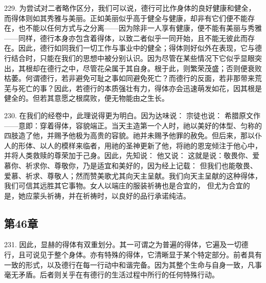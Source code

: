 229. 为尝试对二者略作区分，我们可以说，德行可比作身体的良好健康和健全，而得体则如其秀雅与美丽。正如美丽似乎高于健全与健康，却非有它们便不能存在，也不能以任何方式与之分离——因为除非一人享有健康，便不能有美丽与秀雅——同样，德行本身亦包含着得体，以致二者似乎一同开始，且不能无彼此而存在。因此，德行如同我们一切工作与事业中的健全；得体则好似外在表现，它与德行结合时，只能在我们的思想中被分别认识。因为尽管在某些情况下它似乎显眼突出，其根却在德行之中，尽管花朵属于其自身。根于此，则繁荣茂盛；否则便衰败枯萎。何谓德行，若非避免可耻之事如同避免死亡？而德行的反面，若非那带来荒芜与死亡的事？因此，若德行的本质强壮有力，得体亦会迅速萌发如花，因其根是健全的。但若其意愿之根腐败，便无物能由之生长。\par

230. 在我们的经卷中，此理说得更为明白。因为达味说： 宗徒也说：  希腊原文作——意即：穿着得体，容貌端正。当天主造第一个人时，祂以美好的体型、匀称的四肢造了他，并赐予他极为高贵的容貌。祂并未赐予他罪的赦免。但后来，那以仆人的形体、以人的模样来临者，用祂的圣神更新了他，将祂的恩宠倾注于他心中，并将人类救赎的尊荣加于己身。因此，先知说： 他又说： 这就是说：敬畏你、爱慕你、祈求你、尊敬你，乃是适宜和美好的，因为经上记载：  但我们也能敬畏、爱慕、祈求、尊敬人；然而赞美歌尤其向天主呈献。我们向天主呈献的这种得体，我们可信其远胜其它事物。女人以端庄的服装祈祷也是合宜的， 但尤为合宜的是，她应蒙头祈祷，并在祈祷时，以良好的品行承诺纯洁。\par


\subsection{第46章}

\par

231. 因此，显赫的得体有双重划分。其一可谓之为普遍的得体，它遍及一切德行，且可说见于整个身体。亦有特殊的得体，它清晰显于某个特定部分。前者具有一致的形式，以及德行在每一行动中和谐完备。因为其整个生命与自身一致，凡事毫无矛盾。后者则关乎在有德行的生活过程中所行的任何特殊行动。\par

